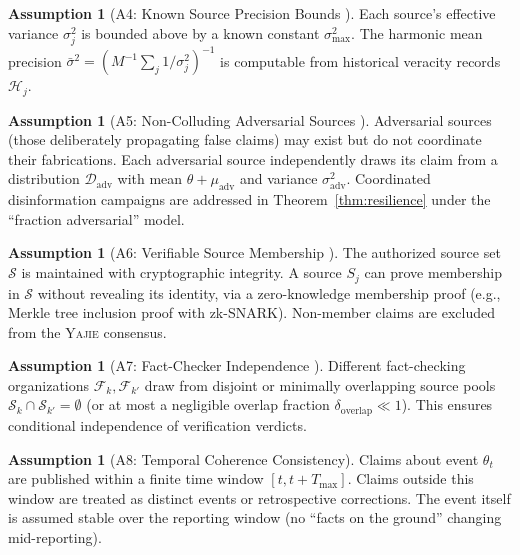 \documentclass[11pt,a4paper]{article}
\theoremstyle{definition}
\newtheorem{assumption}[theorem]{Assumption}
\newcommand{\Yajie}{\textsc{Yajie}}
\newcommand{\sourceSet}{\mathcal{S}}
\begin{document}
\begin{assumption}[A4: Known Source Precision Bounds ]
\label{ass:A4}
Each source's effective variance $\sigma_j^2$ is bounded above by a known constant $\sigma_{\max}^2$. The harmonic mean precision $\bar{\sigma}^2 = (M^{-1}\sum_j 1/\sigma_j^2)^{-1}$ is computable from historical veracity records $\mathcal{H}_j$.
\end{assumption}

\begin{assumption}[A5: Non-Colluding Adversarial Sources ]
\label{ass:A5}
Adversarial sources (those deliberately propagating false claims) may exist but do not coordinate their fabrications. Each adversarial source independently draws its claim from a distribution $\mathcal{D}_{\mathrm{adv}}$ with mean $\theta + \mu_{\mathrm{adv}}$ and variance $\sigma_{\mathrm{adv}}^2$. Coordinated disinformation campaigns are addressed in Theorem~\ref{thm:resilience} under the ``fraction adversarial'' model.
\end{assumption}

\begin{assumption}[A6: Verifiable Source Membership ]
\label{ass:A6}
The authorized source set $\sourceSet$ is maintained with cryptographic integrity. A source $S_j$ can prove membership in $\sourceSet$ without revealing its identity, via a zero-knowledge membership proof (e.g., Merkle tree inclusion proof with zk-SNARK). Non-member claims are excluded from the \Yajie{} consensus.
\end{assumption}

\begin{assumption}[A7: Fact-Checker Independence ]
\label{ass:A7}
Different fact-checking organizations $\mathcal{F}_k, \mathcal{F}_{k'}$ draw from disjoint or minimally overlapping source pools $\sourceSet_k \cap \sourceSet_{k'} = \emptyset$ (or at most a negligible overlap fraction $\delta_{\mathrm{overlap}} \ll 1$). This ensures conditional independence of verification verdicts.
\end{assumption}

\begin{assumption}[A8: Temporal Coherence Consistency]
\label{ass:A8}
Claims about event $\theta_t$ are published within a finite time window $[t, t + T_{\max}]$. Claims outside this window are treated as distinct events or retrospective corrections. The event itself is assumed stable over the reporting window (no ``facts on the ground'' changing mid-reporting).
\end{assumption}
\end{document}

